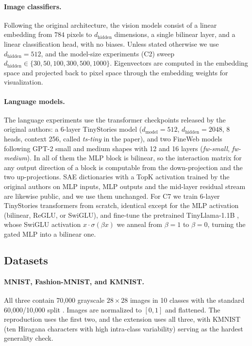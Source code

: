 \documentclass[10pt]{article} %
\begin{document}
\paragraph{Image classifiers.}
Following the original architecture, the vision models consist of a linear embedding
from $784$ pixels to $d_{\text{hidden}}$ dimensions, a single bilinear layer, and a
linear classification head, with no biases. Unless stated otherwise we use
$d_{\text{hidden}} = 512$, and the model-size experiments (C2) sweep
$d_{\text{hidden}} \in \{30, 50, 100, 300, 500, 1000\}$. Eigenvectors are computed in
the embedding space and projected back to pixel space through the embedding weights
for visualization.

\paragraph{Language models.}
The language experiments use the transformer checkpoints released by the original
authors: a 6-layer TinyStories model ($d_{\text{model}} = 512$, $d_{\text{hidden}} =
2048$, 8 heads, context 256, called \emph{ts-tiny} in the paper), and two FineWeb
models following GPT-2 small and medium shapes with 12 and 16 layers
(\emph{fw-small}, \emph{fw-medium}). In all of them the MLP block is bilinear, so the
interaction matrix for any output direction of a block is computable from the
down-projection and the two up-projections. SAE dictionaries with a TopK activation
\citep{gao2024scaling} trained by the original authors on MLP inputs, MLP outputs and
the mid-layer residual stream are likewise public, and we use them unchanged. For C7
we train 6-layer TinyStories transformers from scratch, identical except for the MLP
activation (bilinear, ReGLU, or SwiGLU), and fine-tune the pretrained
TinyLlama-1.1B \citep{zhang2024tinyllama}, whose SwiGLU activation
$x \cdot \sigma(\beta x)$ we anneal from $\beta = 1$ to $\beta = 0$, turning the
gated MLP into a bilinear one.

\subsection{Datasets}
\label{sec:datasets}

\paragraph{MNIST, Fashion-MNIST, and KMNIST.} All three contain 70{,}000 grayscale
$28 \times 28$ images in 10 classes with the standard 60{,}000/10{,}000 split
\citep{lecun1998mnist, xiao2017fashion, clanuwat2018kmnist}. Images are normalized
to $[0, 1]$ and flattened. The reproduction uses the first two, and the extension
uses all three, with KMNIST (ten Hiragana characters with high intra-class variability)
serving as the hardest generality check.
\end{document}
